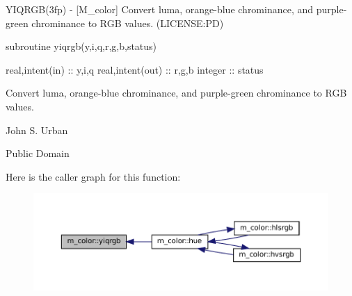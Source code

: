 \begin{DoxyDescription}
\item[\label{_YIQRGB}%
N\+A\+ME ]Y\+I\+Q\+R\+G\+B(3fp) -\/ \mbox{[}M\+\_\+color\mbox{]} Convert luma, orange-\/blue chrominance, and purple-\/green chrominance to R\+GB values. (L\+I\+C\+E\+N\+SE\+:PD) 


\item[S\+Y\+N\+O\+P\+S\+IS ]
\begin{DoxyPre}
    subroutine yiqrgb(y,i,q,r,g,b,status)\end{DoxyPre}



\begin{DoxyPre}     real,intent(in)  :: y,i,q
     real,intent(out) :: r,g,b
     integer          :: status
    \end{DoxyPre}
 


\item[D\+E\+S\+C\+R\+I\+P\+T\+I\+ON ]

Convert luma, orange-\/blue chrominance, and purple-\/green chrominance to R\+GB values.




\item[A\+U\+T\+H\+OR ]

John S. Urban




\item[L\+I\+C\+E\+N\+SE ]

Public Domain




\end{DoxyDescription}Here is the caller graph for this function\+:\nopagebreak
\begin{figure}[H]
\begin{center}
\leavevmode
\includegraphics[width=350pt]{namespacem__color_ac9cd845fb9975144a6deb3a21ce29a29_icgraph}
\end{center}
\end{figure}
